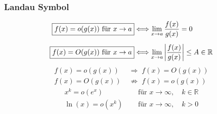 \subsubsection{Landau Symbol}
    \vspace{-1em}
    \begin{align*}
        \fbox{$f(x) = o(g(x)) \textrm{ für } x \to a$} &\Longleftrightarrow \lim_{x \to a} \frac{f(x)}{g(x)} = 0\\[0.5em]
        \fbox{$f(x) = O(g(x)) \textrm{ für } x \to a$}  &\Longleftrightarrow \lim_{x \to a} \left\lvert\frac{f(x)}{g(x)}\right\rvert \leq A \in \mathbb{R}
    \end{align*}
    \vspace*{0.5em}
    \begin{align*}
        f(x) = o(g(x)) \; &\Rightarrow \; f(x) = O(g(x))\\
        f(x) = O(g(x)) \; &\nRightarrow \; f(x) = o(g(x))
    \end{align*}
        \begin{align*}
            x^k = o(e^x) \quad &\textrm{ für } x \to \infty, \quad k \in \mathbb{R}\\
            \ln(x) = o(x^k) \quad &\textrm{ für } x \to \infty, \quad k > 0
        \end{align*}